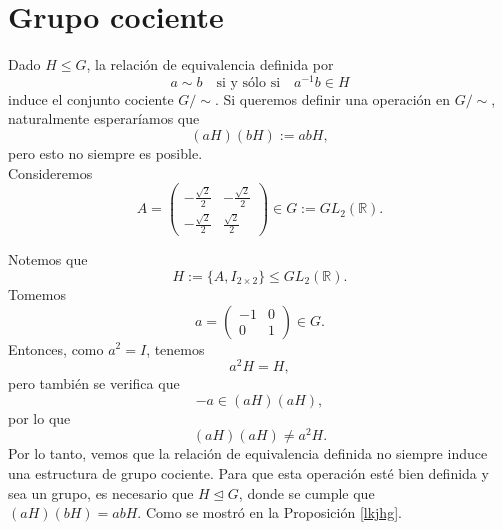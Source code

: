 \section{Grupo cociente}

Dado \( H \leq G \), la relación de equivalencia definida por 
\[
a \sim b \quad \text{si y sólo si} \quad a^{-1}b \in H
\]
induce el conjunto cociente \( G/\sim \). Si queremos definir una operación en \( G/\sim \), naturalmente esperaríamos que 
\[
(aH)(bH) := abH,
\]
pero esto no siempre es posible. \\

\noindent Consideremos 
\[
A = \begin{pmatrix}
	-\frac{\sqrt{2}}{2} & -\frac{\sqrt{2}}{2} \\
	-\frac{\sqrt{2}}{2} & \frac{\sqrt{2}}{2}
\end{pmatrix} \in G := GL_2(\mathbb{R}).
\]

\vspace{0.5cm}

\noindent Notemos que 
\[
H := \{A, I_{2\times 2}\} \leq GL_2(\mathbb{R}).
\]Tomemos 
\[
a = \begin{pmatrix}
	-1 & 0 \\
	0 & 1
\end{pmatrix} \in G.
\] Entonces, como \( a^2 = I \), tenemos 
\[
a^2 H = H,
\]
pero también se verifica que 
\[
-a \in (aH)(aH),
\]
por lo que 
\[
(aH)(aH) \neq a^2 H.
\] Por lo tanto, vemos que la relación de equivalencia definida no siempre induce una estructura de grupo cociente. Para que esta operación esté bien definida y sea un grupo, es necesario que \( H \trianglelefteq G \), donde se cumple que \(
(aH)(bH) = abH.
\) Como se mostró en la Proposición \ref{lkjhg}.

\begin{definicion}
\end{definicion}
\begin{observacion}
\end{observacion}



